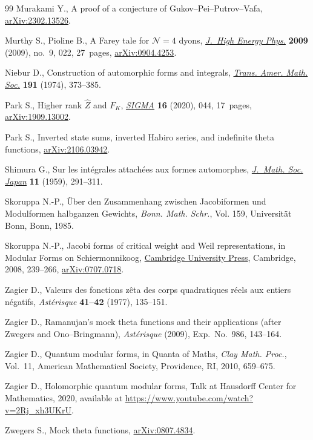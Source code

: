 \documentclass[10pt,a4paper]{amsart}
\theoremstyle{definition}
\numberwithin{equation}{section}
\begin{document}
\begin{thebibliography}{99}
Murakami Y., A proof of a conjecture of {G}ukov--{P}ei--{P}utrov--{V}afa,
 \href{https://arxiv.org/abs/2302.13526}{arXiv:2302.13526}.

Murthy S., Pioline B., A {F}arey tale for {${\mathcal N}=4$} dyons,
 \href{https://doi.org/10.1088/1126-6708/2009/09/022}{\textit{J.~High Energy Phys.}} \textbf{2009} (2009), no.~9, 022, 27~pages,
 \href{https://arxiv.org/abs/0904.4253}{arXiv:0904.4253}.

Niebur D., Construction of automorphic forms and integrals, \href{https://doi.org/10.2307/1997003}{\textit{Trans.
 Amer. Math. Soc.}} \textbf{191} (1974), 373--385.

Park S., Higher rank {$\hat{Z}$} and {$F_K$}, \href{https://doi.org/10.3842/SIGMA.2020.044}{\textit{SIGMA}} \textbf{16}
 (2020), 044, 17~pages, \href{https://arxiv.org/abs/1909.13002}{arXiv:1909.13002}.

Park S., Inverted state sums, inverted {H}abiro series, and indefinite theta
 functions, \href{https://arxiv.org/abs/2106.03942}{arXiv:2106.03942}.

Shimura G., Sur les int\'egrales attach\'ees aux formes automorphes,
 \href{https://doi.org/10.2969/jmsj/01140291}{\textit{J.~Math. Soc. Japan}} \textbf{11} (1959), 291--311.

Skoruppa N.-P., \"Uber den {Z}usammenhang zwischen {J}acobiformen und
 {M}odulformen halbganzen {G}ewichts, \textit{Bonn. Math. Schr.}, Vol. 159,
 Universit\"at Bonn, Bonn, 1985.

Skoruppa N.-P., Jacobi forms of critical weight and {W}eil representations, in
 Modular {F}orms on {S}chiermonnikoog, \href{https://doi.org/10.1017/CBO9780511543371.013}{Cambridge University Press}, Cambridge,
 2008, 239--266, \href{https://arxiv.org/abs/0707.0718}{arXiv:0707.0718}.

Zagier D., Valeurs des fonctions z\^eta des corps quadratiques r\'eels aux
 entiers n\'egatifs, \textit{Ast\'erisque} \textbf{41--42} (1977), 135--151.

Zagier D., Ramanujan's mock theta functions and their applications (after
 {Z}wegers and {O}no--{B}ringmann), \textit{Ast\'erisque} (2009),
 Exp.~No.~986, 143--164.

Zagier D., Quantum modular forms, in Quanta of {M}aths, \textit{Clay Math.
 Proc.}, Vol.~11, American Mathematical Society, Providence, RI, 2010,
 659--675.

Zagier D., Holomorphic quantum modular forms,
{T}alk at {H}ausdorff {C}enter for {M}athematics, 2020, available at \url{https://www.youtube.com/watch?v=2Rj_xh3UKrU}.

Zwegers S., Mock theta functions, \href{https://arxiv.org/abs/0807.4834}{arXiv:0807.4834}.

\end{thebibliography}
\end{document}
